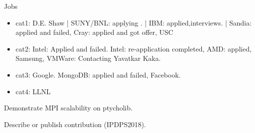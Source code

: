 \documentclass[serif, mathserif, final]{beamer}
\begin{document}
\begin{frame}[label=socialInt] %
  \begin{block}{Jobs}
    \begin{itemize}
      \tiny \item \tiny cat1: D.E. Shaw | SUNY/BNL: applying . | IBM: applied,interviews.  | Sandia:
      applied and failed, Cray: applied and got offer, USC
    \item \tiny cat2: Intel: Applied and failed. Intel: re-application
      completed, AMD: applied, Samsung, VMWare: Contacting Yavatkar Kaka. 
    \item \tiny cat3: Google. MongoDB: applied and failed, Facebook. 
    \item \tiny cat4: LLNL 
    \end{itemize} 
  \end{block}


Demonstrate MPI scalability on ptycholib. 

Describe or publish contribution (IPDPS2018).  





































 


\end{frame}
\end{document}
